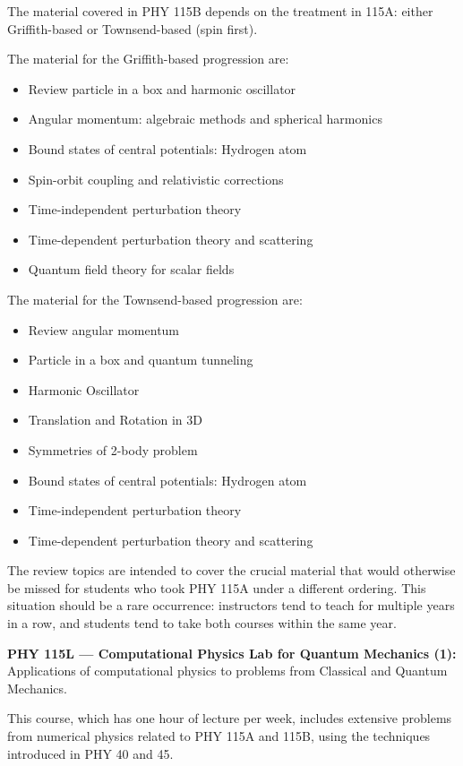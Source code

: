 \documentclass[12pt]{article}
\begin{document}
The material covered in PHY 115B depends on the treatment in 115A: either Griffith-based or Townsend-based (spin first).

The material for the Griffith-based progression are:
\begin{itemize}
\item Review particle in a box and harmonic oscillator 
\item Angular momentum: algebraic methods and spherical harmonics
\item Bound states of central potentials: Hydrogen atom
\item Spin-orbit coupling and relativistic corrections
\item Time-independent perturbation theory
\item Time-dependent perturbation theory and scattering
\item Quantum field theory for scalar fields
\end{itemize}

The material for the Townsend-based progression are:
\begin{itemize}
\item Review angular momentum 
\item Particle in a box and quantum tunneling
\item Harmonic Oscillator
\item Translation and Rotation in 3D
\item Symmetries of 2-body problem 
\item Bound states of central potentials: Hydrogen atom
\item Time-independent perturbation theory
\item Time-dependent perturbation theory and scattering
\end{itemize}

The review topics are intended to cover the crucial material that would
otherwise be missed for students who took PHY 115A under a different
ordering.  This situation should be a rare occurrence: instructors tend
to teach for multiple years in a row, and students tend to take both
courses within the same year.

\vskip 1cm
\noindent
{\bf PHY 115L --- Computational Physics Lab for Quantum Mechanics (1):}
Applications of computational physics to problems from Classical and Quantum Mechanics.

This course, which has one hour of lecture per week, includes
extensive problems from numerical physics related to PHY 115A and 115B,
using the techniques introduced in PHY 40 and 45.
\end{document}
